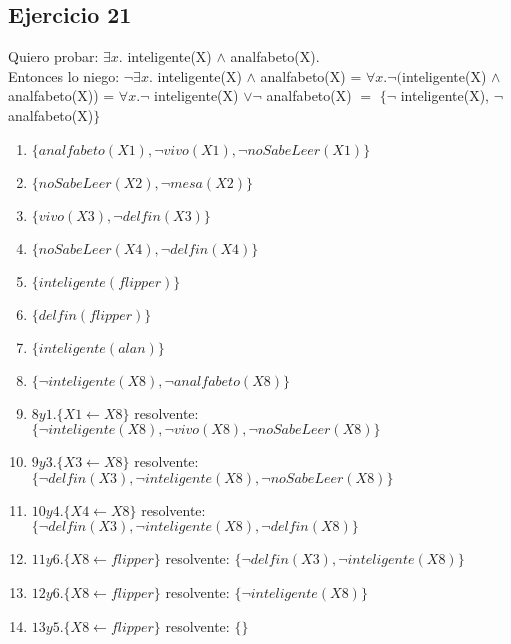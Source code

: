 \documentclass[10pt,a4paper]{article}
\begin{document}
\subsection{Ejercicio 21}
    Quiero probar: $\exists x.$ inteligente(X) $\land$ analfabeto(X). \\
    Entonces lo niego: $\lnot \exists x.$ inteligente(X) $\land$ analfabeto(X) = $\forall x. \lnot ($inteligente(X) $\land$ analfabeto(X)) = $\forall x. \lnot$ inteligente(X) $\lor \lnot$ analfabeto(X) $=$ $\{ \lnot$ inteligente(X), $\lnot$ analfabeto(X)$\}$
    \begin{enumerate}
        \item $\{analfabeto(X1), \lnot vivo(X1), \lnot noSabeLeer(X1) \}$
        \item $\{noSabeLeer(X2), \lnot mesa(X2)\}$
        \item $\{vivo(X3), \lnot delfin(X3) \}$
        \item $\{noSabeLeer(X4), \lnot delfin(X4)\}$
        \item $\{inteligente(flipper)\}$
        \item $\{delfin(flipper)\}$
        \item $\{inteligente(alan)\}$
        \item $\{ \lnot inteligente(X8), \lnot analfabeto(X8)\}$
        \item $8y1. \{X1 \leftarrow X8 \}$ resolvente: $\{ \lnot inteligente(X8), \lnot vivo(X8), \lnot noSabeLeer(X8) \}$
        \item $9y3. \{X3 \leftarrow X8\}$ resolvente: $\{ \lnot delfin(X3),\lnot inteligente(X8), \lnot noSabeLeer(X8)\}$
        \item $10y4.\{X4 \leftarrow X8\}$ resolvente: $\{ \lnot delfin(X3),\lnot inteligente(X8), \lnot delfin(X8)\}$
        \item $11y6.\{X8 \leftarrow flipper\}$ resolvente: $\{ \lnot delfin(X3),\lnot inteligente(X8)\}$
        \item $12y6. \{X8 \leftarrow flipper\}$ resolvente: $\{ \lnot inteligente(X8)\}$
        \item $13y5. \{X8 \leftarrow flipper\}$ resolvente: $\{\}$
    \end{enumerate}
\end{document}
